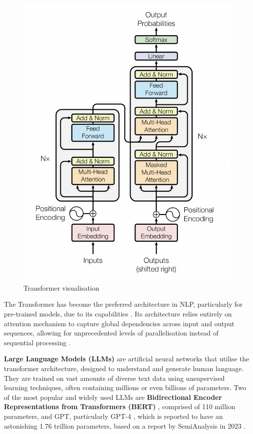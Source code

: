 \begin{figure}[htbp]
    \centering
    \includegraphics[width=0.7\linewidth]{images/transformer.png}
    \caption{Transformer visualisation \cite{vaswani-2023-attention}}
    \label{fig:transformer}
\end{figure}

The Transformer has become the preferred architecture in NLP, particularly for pre-trained models, due to its capabilities \cite{lin-2022-survey-transformers}. Its architecture relies entirely on attention mechanism to capture global dependencies across input and output sequences, allowing for unprecedented levels of parallelisation instead of sequential processing \cite{vaswani-2023-attention}.

\textbf{Large Language Models (LLMs)} are artificial neural networks that utilise the transformer architecture, designed to understand and generate human language. They are trained on vast amounts of diverse text data using unsupervised learning techniques, often containing millions or even billions of parameters. Two of the most popular and widely used LLMs are \textbf{Bidirectional Encoder Representations from Transformers (BERT)} \cite{devlin-2019-bert}, comprised of 110 million parameters, and GPT, particularly GPT-4 \cite{openai-2024-gpt4}, which is reported to have an astonishing 1.76 trillion parameters, based on a report by SemiAnalysis in 2023 \cite{semianalysis-gpt4}.

